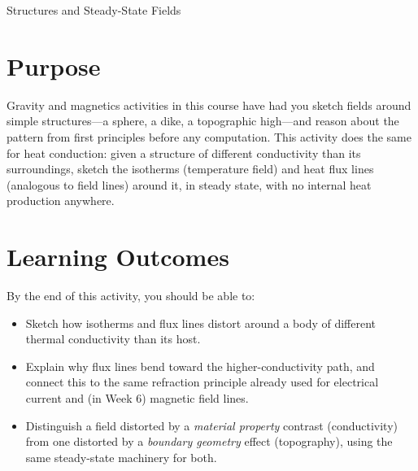 \begin{activity}{Structures and Steady-State Fields}

\newcommand{\qax}[1]{
    \node[above] at (5,4.2) {#1};
    \draw[thick,->] (0,1) -- (0,4.2) node[above] {$q_0$};
    \draw[thick,->] (0,2.5) -- (10.2,2.5) node[right] {$x$};
}

\newcommand{\base}[1]{
    \draw[dashed,thick,gray!60] (0,#1) -- (10,#1) node[right,black] {$T_b$};
    \foreach \x in {0,2,4,6,8,10} \draw[thick,<-] (\x,#1) -- (\x,{#1-0.5}) node[below] {$q_b$};
}

\section*{Purpose}
Gravity and magnetics activities in this course have had you sketch fields around simple structures---a sphere, a dike, a topographic high---and reason about the pattern from first principles before any computation. This activity does the same for heat conduction: given a structure of different conductivity than its surroundings, sketch the isotherms (temperature field) and heat flux lines (analogous to field lines) around it, in steady state, with no internal heat production anywhere.

\section*{Learning Outcomes}
By the end of this activity, you should be able to:
\begin{itemize}
    \item Sketch how isotherms and flux lines distort around a body of different thermal conductivity than its host.
    \item Explain why flux lines bend toward the higher-conductivity path, and connect this to the same refraction principle already used for electrical current and (in Week 6) magnetic field lines.
    \item Distinguish a field distorted by a \emph{material property} contrast (conductivity) from one distorted by a \emph{boundary geometry} effect (topography), using the same steady-state machinery for both.
\end{itemize}


\end{activity}
